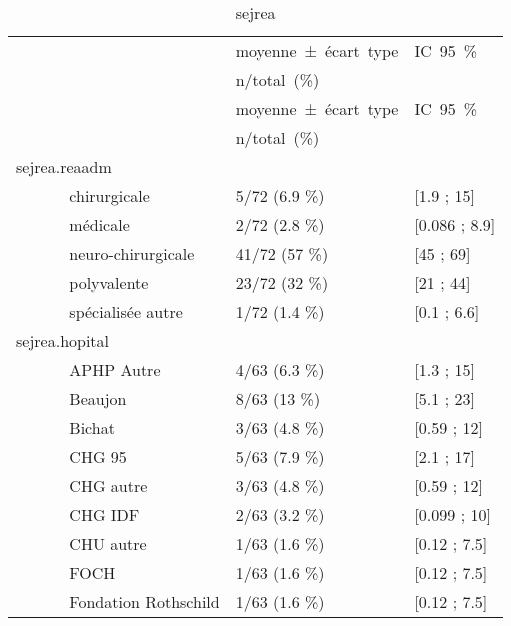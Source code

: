 \documentclass[]{article}
\begin{document}
\begin{longtable}{lll}
                                                &\mbox{moyenne ± écart type}&\mbox{IC 95 \%}\\
                                                &\mbox{n/total (\%)}&\\
                                                \midrule
                                                \endfirsthead
                                                \midrule
                                                &\mbox{moyenne ± écart type}&\mbox{IC 95 \%}\\
                                                &\mbox{n/total (\%)}&\\
                                                \midrule
                                                \endhead
                                                \bottomrule
                                                \endfoot
                                                \bottomrule
                                                \caption{sejrea}
                                                \label{tabdsejrea}
                                                \endlastfoot
                                                sejrea.reaadm &   &   \\ 
  ~~~~~~ chirurgicale & 5/72 (6.9 \%) &  [1.9 ; 15] \\ 
  ~~~~~~ médicale & 2/72 (2.8 \%) &  [0.086 ; 8.9] \\ 
  ~~~~~~ neuro-chirurgicale & 41/72 (57 \%) &  [45 ; 69] \\ 
  ~~~~~~ polyvalente & 23/72 (32 \%) &  [21 ; 44] \\ 
  ~~~~~~ spécialisée autre & 1/72 (1.4 \%) &  [0.1 ; 6.6] \\ 
  sejrea.hopital &   &   \\ 
  ~~~~~~ APHP Autre & 4/63 (6.3 \%) &  [1.3 ; 15] \\ 
  ~~~~~~ Beaujon & 8/63 (13 \%) &  [5.1 ; 23] \\ 
  ~~~~~~ Bichat & 3/63 (4.8 \%) &  [0.59 ; 12] \\ 
  ~~~~~~ CHG 95 & 5/63 (7.9 \%) &  [2.1 ; 17] \\ 
  ~~~~~~ CHG autre  & 3/63 (4.8 \%) &  [0.59 ; 12] \\ 
  ~~~~~~ CHG IDF & 2/63 (3.2 \%) &  [0.099 ; 10] \\ 
  ~~~~~~ CHU autre & 1/63 (1.6 \%) &  [0.12 ; 7.5] \\ 
  ~~~~~~ FOCH & 1/63 (1.6 \%) &  [0.12 ; 7.5] \\ 
  ~~~~~~ Fondation Rothschild & 1/63 (1.6 \%) &  [0.12 ; 7.5] \\ 

\end{longtable}
\end{document}
